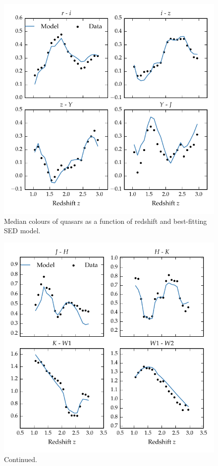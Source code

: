 \begin{figure}[t!]
\includegraphics[width=\textwidth]{figures/chapter05/sed_color_plot_1.pdf}
\caption[{Median colours of quasars as a function of redshift and best-fitting SED model.}]{Median colours of quasars as a function of redshift and best-fitting SED model.}
  \label{fig:color}
\end{figure} 

\begin{figure}[t!]
\ContinuedFloat
    \centering
    \includegraphics[width=\columnwidth]{figures/chapter05/sed_color_plot_2.pdf} 
    \caption{Continued.}     
\end{figure}


